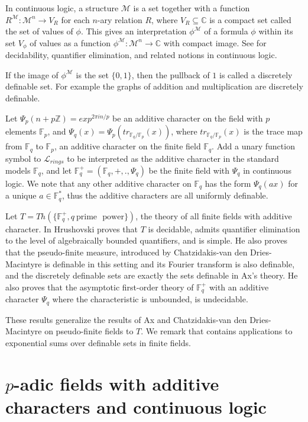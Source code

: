 \documentclass[12pt]{amsart}
\def\C{\mathbb{C}}
\def\F{\mathbb{F}}
\def\Z{\mathbb{Z}}
\def\cL{\mathcal{L}}
\def\C{\mathbb{C}}
\def\F{\mathbb{F}}
\def\cL{\mathcal{L}}
\def\cM{\mathcal M}
\numberwithin{equation}{section}
\begin{document}
In continuous logic, a structure $\cM$ is a set together with a function $R^{\cM}: \cM^n \rightarrow V_R$
for each $n$-ary relation $R$, where $V_R\subseteq \C$ is a compact set called the set of values of $\phi$. This gives an interpretation $\phi^{\cM}$ of a formula $\phi$ within its set $V_{\phi}$ of values as a function $\phi^{\cM}:\cM^n\rightarrow \C$ with compact image. See \cite{udi-char} for decidability, quantifier elimination, and related notions in continuous logic.

If the image of $\phi^{\cM}$ is the set $\{0,1\}$, then the pullback of $1$ is called a discretely definable set. For example the graphs of addition and multiplication are discretely definable. 

Let $\Psi_p(n+p\Z)=exp^{2\pi i n/p}$ be an additive character on the field with $p$ elements $\F_p$, and $\Psi_q(x)=\Psi_p(tr_{\F_q/\F_p}(x))$, where $tr_{\F_q/\F_p}(x)$ is the trace map from $\F_q$ to $\F_p$, 
an additive character on the finite field $\F_q$. 
Add a unary function symbol to $\cL_{rings}$ to be interpreted as the additive character in the standard models $\F_q$, and let $\F_q^+=(\F_q,+,.,\Psi_q)$ be the finite field with $\Psi_q$ in continuous logic. We note that any other additive character on $\F_q$ has the form $\Psi_q(ax)$ for a unique $a\in \F_q^*$, thus the additive characters are all uniformly definable.

Let $T=Th(\{\F_q^+, q~\text{prime ~power}\})$, the theory  of all finite fields with additive character. In \cite{udi-char} Hrushovski proves that $T$ is decidable, admits quantifier elimination to the level of algebraically bounded quantifiers, and is simple. He also proves that the pseudo-finite measure, 
introduced by Chatzidakis-van den Dries-Macintyre \cite{CDM} is definable in this setting and its Fourier transform is also definable, and the discretely definable sets are exactly the sets definable in Ax's theory. 
He also proves that the asymptotic first-order theory of $\F_q^+$ with an additive character $\Psi_q$ where the characteristic is unbounded, is undecidable. 

These results generalize the results of Ax \cite{ax} and 
Chatzidakis-van den Dries-Macintyre on pseudo-finite fields to $T$. We remark that \cite{udi-char} contains applications to exponential sums over definable sets in finite fields.

\section{\bf $p$-adic fields with additive characters and continuous logic}\label{ad-char}
\end{document}
